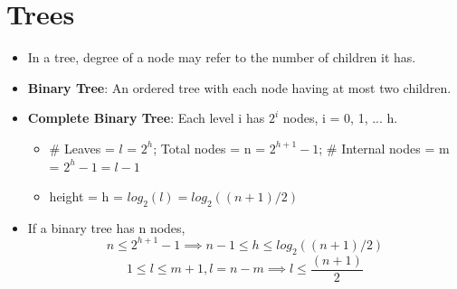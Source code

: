 \documentclass{report}
\begin{document}
\section{Trees}
\begin{itemize}
\item In a tree, degree of a node may refer to the number of children it has.
\item \textbf{Binary Tree}: An ordered tree with each node having at most two children.
\item \textbf{Complete Binary Tree}: Each level i has $2^i$ nodes, i = 0, 1, ... h.
\begin{itemize}
    \item \# Leaves = $l$ = $2^h$; Total nodes = n = $2^{h+1} - 1$; \# Internal nodes = m = $2^{h}-1 = l - 1$
    \item height = h = $log_2(l) = log_2((n+1)/2)$
\end{itemize}
\item If a binary tree has n nodes,
\begin{equation*}
n \le 2^{h+1} - 1 \implies n-1 \le h \le log_2((n+1)/2)
\end{equation*}
\begin{equation*}
1 \le l \le m+1, l = n-m \implies l \le \frac{(n+1)}{2}
\end{equation*}
\end{itemize}
\end{document}
